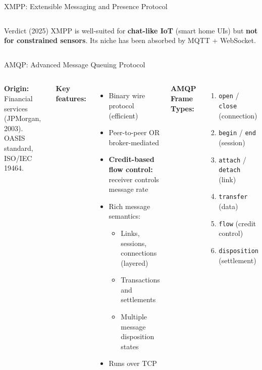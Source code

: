 \documentclass[aspectratio=169,11pt]{beamer}
\begin{document}
\begin{frame}{XMPP: Extensible Messaging and Presence Protocol}
\begin{columns}
        \vspace{0.1cm}
        \begin{alertblock}{Verdict (2025)}
            XMPP is well-suited for \textbf{chat-like IoT} (smart home UIs) but \textbf{not for constrained sensors}. Its niche has been absorbed by MQTT + WebSocket.
        \end{alertblock}
    \end{columns}
\end{frame}

\begin{frame}{AMQP: Advanced Message Queuing Protocol}
    \begin{columns}
        \textbf{Origin:} Financial services (JPMorgan, 2003). OASIS standard, ISO/IEC 19464.
        
        \vspace{0.2cm}
        \textbf{Key features:}
        \begin{itemize}
            \item Binary wire protocol (efficient)
            \item Peer-to-peer OR broker-mediated
            \item \textbf{Credit-based flow control:} receiver controls message rate
            \item Rich message semantics:
            \begin{itemize}
                \item Links, sessions, connections (layered)
                \item Transactions and settlements
                \item Multiple message disposition states
            \end{itemize}
            \item Runs over TCP
        \end{itemize}
        
        \textbf{AMQP Frame Types:}
        \begin{enumerate}
            \item \texttt{open} / \texttt{close} (connection)
            \item \texttt{begin} / \texttt{end} (session)
            \item \texttt{attach} / \texttt{detach} (link)
            \item \texttt{transfer} (data)
            \item \texttt{flow} (credit control)
            \item \texttt{disposition} (settlement)
        \end{enumerate}
        

\end{columns}
\end{frame}
\end{document}
